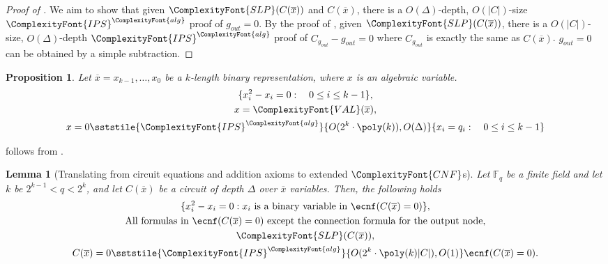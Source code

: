 \documentclass[11pt,letter]{article}
\newtheorem{lemma}[theorem]{Lemma}
\newtheorem{proposition}[theorem]{Proposition}
\theoremstyle{remark} %
\newcommand{\alg}{\ComplexityFont{alg}}
\newcommand{\IPS}{%
    {
        \ComplexityFont{IPS} 
    }
}
\newcommand{\CNF}{ %
    {
        \ComplexityFont{CNF}
    }
}
\newcommand{\VAL}{ %
    {
        \ComplexityFont{VAL}
    }
}
\newcommand{\SLP}{ %
    {
        \ComplexityFont{SLP}
    }
}
\newcommand{\F}{\mathbb{F}}
\begin{document}
{    \begin{proof}[Proof of ]
        We aim to show that given $\SLP(C(\overline{x}))$ and $C(\overline{x})$, there is a $O(\Delta)$-depth, $O(|C|)$-size $\IPS^\alg$ proof of $g_{out} =0$. By the proof of , given $\SLP(C(\overline{x}))$, there is a $O(|C|)$-size, $O(\Delta)$-depth $\IPS^\alg$ proof of $C_{g_{out}} - g_{out} =0$ where $C_{g_{out}}$ is exactly the same as $C(\overline{x})$. $g_{out}=0$ can be obtained by a simple subtraction.
    \end{proof}



    
    \begin{proposition}
        \label{prop: derive xi =0}
        Let $\overline{x} = x_{k-1},\dots, x_0$ be a $k$-length binary representation, where $x$ is an algebraic variable.
        \begin{gather*}
            \{x_i^2-x_i =0: \quad 0 \leq i \leq k-1\},\\
                x= \VAL(\overline{x}),\\
            x=0 \sststile{\IPS^\alg}{O(2^k \cdot \poly(k) ),O(\Delta)} \{x_i = q_i: \quad 0 \leq i \leq k-1\}
    \end{gather*}
    \end{proposition}

     follows from .

    
    \begin{lemma}[Translating from circuit equations and addition axioms to extended $\CNF$s]
        \label{lemma: translating from circuit equations and addition axioms to ecnf}
        Let $\F_q$ be a finite field and let $k$ be $2^{k-1} < q < 2^k$, and let $C(\overline{x})$ be a circuit of depth $\Delta$ over $\overline{x}$ variables. Then, the following holds
        \begin{gather*}
            \{x_i^2-x_i =0: x_i \text{ is a binary variable in }\ecnf(C(\overline{x})=0)\}, \\
            \text{All formulas in }\ecnf(C(\overline{x})=0) \text{ except the connection formula for the output node},\\
            \SLP(C(\overline{x})),\\
            C(\overline{x})=0 \sststile{\IPS^\alg}{O(2^k\cdot \poly(k)|C|),O(1)} \ecnf(C(\overline{x})=0) .
        \end{gather*}
    \end{lemma}


}
\end{document}
